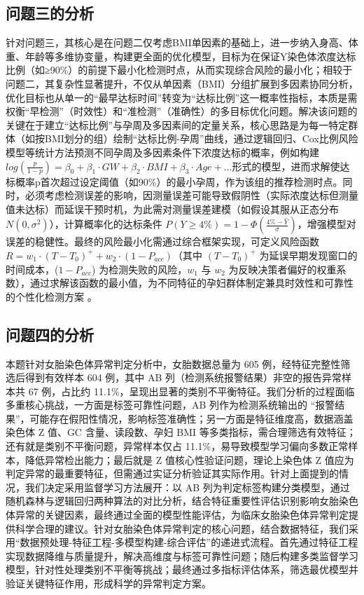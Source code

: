 \documentclass[withoutpreface,bwprint]{cumcmthesis} %
\begin{document}
\subsection{问题三的分析}

针对问题三，其核心是在问题二仅考虑BMI单因素的基础上，进一步纳入身高、体重、年龄等多维协变量，构建更全面的优化模型，目标为在保证Y染色体浓度达标比例（如≥90\%）的前提下最小化检测时点，从而实现综合风险的最小化；相较于问题二，其复杂性显著提升，不仅从单因素（BMI）分组扩展到多因素协同分析，优化目标也从单一的“最早达标时间”转变为“达标比例”这一概率性指标，本质是需权衡“早检测”（时效性）和“准检测”（准确性）的多目标优化问题。解决该问题的关键在于建立“达标比例”与孕周及多因素间的定量关系，核心思路是为每一特定群体（如按BMI划分的组）绘制“达标比例-孕周”曲线，通过逻辑回归、Cox比例风险模型等统计方法预测不同孕周及多因素条件下浓度达标的概率，例如构建 $log(\frac{p}{1-p}) = \beta_0 + \beta_1 \cdot GW + \beta_2 \cdot BMI + \beta_3 \cdot Age + \ldots$形式的模型，进而求解使达标概率p首次超过设定阈值（如90\%）的最小孕周，作为该组的推荐检测时点。同时，必须考虑检测误差的影响，因测量误差可能导致假阴性（实际浓度达标但测量值未达标）而延误干预时机，为此需对测量误差建模（如假设其服从正态分布 $N(0, \sigma^2)$），计算概率化的达标条件 $P(Y \geq 4\%) = 1 - \Phi(\frac{4\% - \hat{Y}}{\sigma})$，增强模型对误差的稳健性。最终的风险最小化需通过综合框架实现，可定义风险函数 $R = w_1 \cdot (T - T_0)^+ + w_2 \cdot (1 - P_{acc})$（其中 $(T - T_0)^+$ 为延误早期发现窗口的时间成本，($1 - P_{acc}$) 为检测失败的风险，$w_1$ 与 $w_2$ 为反映决策者偏好的权重系数），通过求解该函数的最小值，为不同特征的孕妇群体制定兼具时效性和可靠性的个性化检测方案 。

\subsection{问题四的分析}
本题针对女胎染色体异常判定分析中，女胎数据总量为 605 例，经特征完整性筛选后得到有效样本 604 例，其中 AB 列（检测系统报警结果）非空的报告异常样本共 67 例，占比约 11.1\%，呈现出显著的类别不平衡特征。我们分析的过程面临多重核心挑战，一方面是标签可靠性问题，AB 列作为检测系统输出的 “报警结果”，可能存在假阳性情况，影响标签准确性；另一方面是特征维度高，数据涵盖染色体 Z 值、GC 含量、读段数、孕妇 BMI 等多类指标，需合理筛选有效特征；还有就是类别不平衡问题，异常样本仅占 11.1\%，易导致模型学习偏向多数正常样本，降低异常检出能力；最后就是 Z 值核心性验证问题，理论上染色体 Z 值应为判定异常的最重要特征，但需通过实证分析验证其实际作用。针对上面提到的情况，我们决定采用监督学习方法展开：以 AB 列为判定标签构建分类模型，通过随机森林与逻辑回归两种算法的对比分析，结合特征重要性评估识别影响女胎染色体异常的关键因素，最终通过全面的模型性能评估，为临床女胎染色体异常判定提供科学合理的建议。针对女胎染色体异常判定的核心问题，结合数据特征，我们采用“数据预处理-特征工程-多模型构建-综合评估”的递进式流程。首先通过特征工程实现数据降维与质量提升，解决高维度与标签可靠性问题；随后构建多类监督学习模型，针对性处理类别不平衡等挑战；最终通过多指标评估体系，筛选最优模型并验证关键特征作用，形成科学的异常判定方案。
\end{document}
